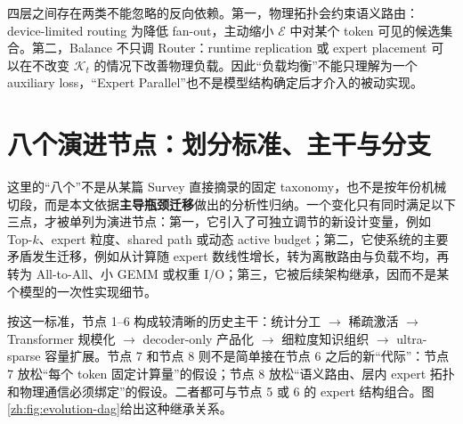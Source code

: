 \documentclass[10pt,a4paper,fontset=none]{ctexart}
\newcommand{\term}[1]{\textbf{#1}}
\begin{document}
四层之间存在两类不能忽略的反向依赖。第一，物理拓扑会约束语义路由：device-limited routing 为降低 fan-out，主动缩小 $\mathcal{E}$ 中对某个 token 可见的候选集合。第二，Balance 不只调 Router：runtime replication 或 expert placement 可以在不改变 $\mathcal{K}_t$ 的情况下改善物理负载。因此“负载均衡”不能只理解为一个 auxiliary loss，“Expert Parallel”也不是模型结构确定后才介入的被动实现。

\section{八个演进节点：划分标准、主干与分支}

这里的“八个”不是从某篇 Survey 直接摘录的固定 taxonomy，也不是按年份机械切段，而是本文依据\term{主导瓶颈迁移}做出的分析性归纳。一个变化只有同时满足以下三点，才被单列为演进节点：第一，它引入了可独立调节的新设计变量，例如 Top-$k$、expert 粒度、shared path 或动态 active budget；第二，它使系统的主要矛盾发生迁移，例如从计算随 expert 数线性增长，转为离散路由与负载不均，再转为 All-to-All、小 GEMM 或权重 I/O；第三，它被后续架构继承，因而不是某个模型的一次性实现细节。

按这一标准，节点 1--6 构成较清晰的历史主干：统计分工 $\rightarrow$ 稀疏激活 $\rightarrow$ Transformer 规模化 $\rightarrow$ decoder-only 产品化 $\rightarrow$ 细粒度知识组织 $\rightarrow$ ultra-sparse 容量扩展。节点 7 和节点 8 则不是简单接在节点 6 之后的新“代际”：节点 7 放松“每个 token 固定计算量”的假设；节点 8 放松“语义路由、层内 expert 拓扑和物理通信必须绑定”的假设。二者都可与节点 5 或 6 的 expert 结构组合。图\ref{zh:fig:evolution-dag}给出这种继承关系。
\end{document}
